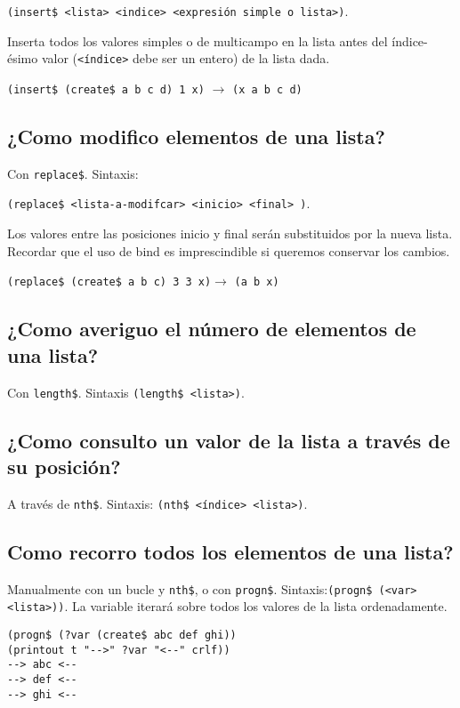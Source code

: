 \documentclass[11pt,svgnames]{scrbook}
\begin{document}
\texttt{(insert\$ <lista> <indice> <expresión
simple o
lista>)}.

Inserta todos los valores simples o de multicampo en la lista antes del
índice-ésimo valor (\texttt{<índice>} debe ser un entero) de la lista dada.
\medskip

\texttt{(insert\$ (create\$ a b c d) 1 x)} $\longrightarrow$ 
 \texttt{(x a b c d)}

\subsection{¿Como modifico elementos de una lista?}


Con \texttt{replace\$}. Sintaxis: 

\texttt{(replace\$ <lista-a-modifcar>\
<inicio>\ <final>\ <lista-nuevos-valores>)}. 

Los valores entre las posiciones
inicio y final serán
substituidos por la nueva lista. 
Recordar que el uso de bind es imprescindible  si queremos conservar los
cambios.
\medskip

\texttt{(replace\$ (create\$ a b c) 3 3 x)}$\longrightarrow$
 \texttt{(a b x)}

 \subsection{¿Como averiguo el número de elementos de una lista?}


Con \texttt{length\$}. Sintaxis \texttt{(length\$ <lista>)}.

\subsection{¿Como consulto un valor de la lista a través de su posición?}

A través de \texttt{nth\$}. Sintaxis: \texttt{(nth\$ <índice> <lista>)}.

\subsection{Como recorro todos los elementos de una lista?}


Manualmente con un bucle y \texttt{nth\$}, o con \texttt{progn\$}.
Sintaxis:\texttt{(progn\$ (<var> <lista>))}. La variable iterará sobre todos los
valores de la lista ordenadamente.

\begin{verbatim}
(progn$ (?var (create$ abc def ghi))
(printout t "-->" ?var "<--" crlf))
--> abc <--
--> def <--
--> ghi <--
\end{verbatim} 
\end{document}

